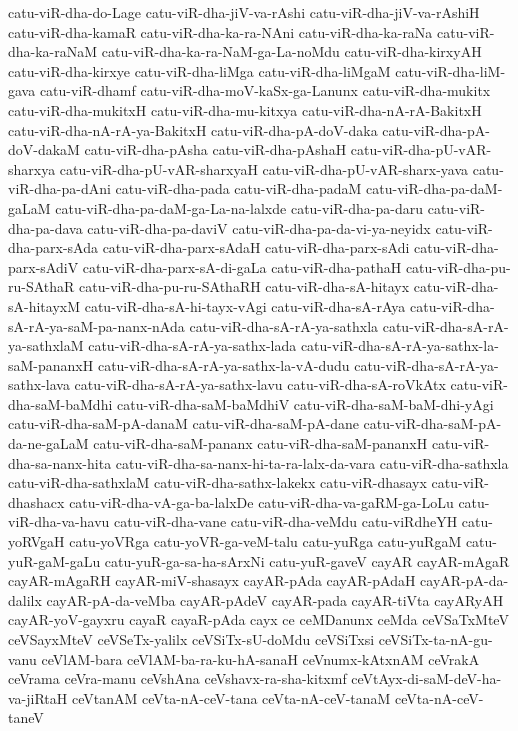 {catu-viR-dha-do-Lage
catu-viR-dha-jiV-va-rAshi
catu-viR-dha-jiV-va-rAshiH
catu-viR-dha-kamaR
catu-viR-dha-ka-ra-NAni
catu-viR-dha-ka-raNa
catu-viR-dha-ka-raNaM
catu-viR-dha-ka-ra-NaM-ga-La-noMdu
catu-viR-dha-kirxyAH
catu-viR-dha-kirxye
catu-viR-dha-liMga
catu-viR-dha-liMgaM
catu-viR-dha-liM-gava
catu-viR-dhamf
catu-viR-dha-moV-kaSx-ga-Lanunx
catu-viR-dha-mukitx
catu-viR-dha-mukitxH
catu-viR-dha-mu-kitxya
catu-viR-dha-nA-rA-BakitxH
catu-viR-dha-nA-rA-ya-BakitxH
catu-viR-dha-pA-doV-daka
catu-viR-dha-pA-doV-dakaM
catu-viR-dha-pAsha
catu-viR-dha-pAshaH
catu-viR-dha-pU-vAR-sharxya
catu-viR-dha-pU-vAR-sharxyaH
catu-viR-dha-pU-vAR-sharx-yava
catu-viR-dha-pa-dAni
catu-viR-dha-pada
catu-viR-dha-padaM
catu-viR-dha-pa-daM-gaLaM
catu-viR-dha-pa-daM-ga-La-na-lalxde
catu-viR-dha-pa-daru
catu-viR-dha-pa-dava
catu-viR-dha-pa-daviV
catu-viR-dha-pa-da-vi-ya-neyidx
catu-viR-dha-parx-sAda
catu-viR-dha-parx-sAdaH
catu-viR-dha-parx-sAdi
catu-viR-dha-parx-sAdiV
catu-viR-dha-parx-sA-di-gaLa
catu-viR-dha-pathaH
catu-viR-dha-pu-ru-SAthaR
catu-viR-dha-pu-ru-SAthaRH
catu-viR-dha-sA-hitayx
catu-viR-dha-sA-hitayxM
catu-viR-dha-sA-hi-tayx-vAgi
catu-viR-dha-sA-rAya
catu-viR-dha-sA-rA-ya-saM-pa-nanx-nAda
catu-viR-dha-sA-rA-ya-sathxla
catu-viR-dha-sA-rA-ya-sathxlaM
catu-viR-dha-sA-rA-ya-sathx-lada
catu-viR-dha-sA-rA-ya-sathx-la-saM-pananxH
catu-viR-dha-sA-rA-ya-sathx-la-vA-dudu
catu-viR-dha-sA-rA-ya-sathx-lava
catu-viR-dha-sA-rA-ya-sathx-lavu
catu-viR-dha-sA-roVkAtx
catu-viR-dha-saM-baMdhi
catu-viR-dha-saM-baMdhiV
catu-viR-dha-saM-baM-dhi-yAgi
catu-viR-dha-saM-pA-danaM
catu-viR-dha-saM-pA-dane
catu-viR-dha-saM-pA-da-ne-gaLaM
catu-viR-dha-saM-pananx
catu-viR-dha-saM-pananxH
catu-viR-dha-sa-nanx-hita
catu-viR-dha-sa-nanx-hi-ta-ra-lalx-da-vara
catu-viR-dha-sathxla
catu-viR-dha-sathxlaM
catu-viR-dha-sathx-lakekx
catu-viR-dhasayx
catu-viR-dhashacx
catu-viR-dha-vA-ga-ba-lalxDe
catu-viR-dha-va-gaRM-ga-LoLu
catu-viR-dha-va-havu
catu-viR-dha-vane
catu-viR-dha-veMdu
catu-viRdheYH
catu-yoRVgaH
catu-yoVRga
catu-yoVR-ga-veM-talu
catu-yuRga
catu-yuRgaM
catu-yuR-gaM-gaLu
catu-yuR-ga-sa-ha-sArxNi
catu-yuR-gaveV
cayAR
cayAR-mAgaR
cayAR-mAgaRH
cayAR-miV-shasayx
cayAR-pAda
cayAR-pAdaH
cayAR-pA-da-dalilx
cayAR-pA-da-veMba
cayAR-pAdeV
cayAR-pada
cayAR-tiVta
cayARyAH
cayAR-yoV-gayxru
cayaR
cayaR-pAda
cayx
ce
ceMDanunx
ceMda
ceVSaTxMteV
ceVSayxMteV
ceVSeTx-yalilx
ceVSiTx-sU-doMdu
ceVSiTxsi
ceVSiTx-ta-nA-gu-vanu
ceVlAM-bara
ceVlAM-ba-ra-ku-hA-sanaH
ceVnumx-kAtxnAM
ceVrakA
ceVrama
ceVra-manu
ceVshAna
ceVshavx-ra-sha-kitxmf
ceVtAyx-di-saM-deV-ha-va-jiRtaH
ceVtanAM
ceVta-nA-ceV-tana
ceVta-nA-ceV-tanaM
ceVta-nA-ceV-taneV
}

